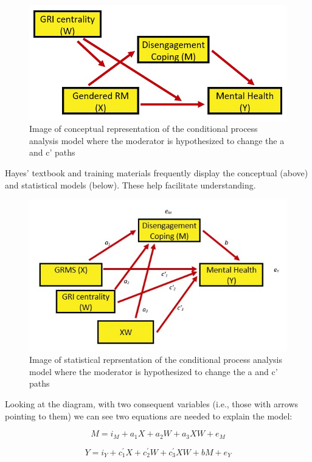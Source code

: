 \documentclass[
  english,
]{book}
\begin{document}
\begin{figure}
\centering
\includegraphics{images/ModMed/LewisModMed.jpg}
\caption{Image of conceptual representation of the conditional process analysis model where the moderator is hypothesized to change the a and c' paths}
\end{figure}

Hayes' \citeyearpar{hayes_introduction_2018} textbook and training materials frequently display the conceptual (above) and statistical models (below). These help facilitate understanding.

\begin{figure}
\centering
\includegraphics{images/ModMed/LewisStatistical.jpg}
\caption{Image of statistical reprsentation of the conditional process analysis model where the moderator is hypothesized to change the a and c' paths}
\end{figure}

Looking at the diagram, with two consequent variables (i.e., those with arrows pointing to them) we can see two equations are needed to explain the model:

\[M = i_{M}+a_{1}X + a_{2}W + a_{3}XW + e_{M}\]

\[Y = i_{Y}+c_{1}^{'}X+ c_{2}^{'}W+c_{3}^{'}XW+ bM+e_{Y}\]
\end{document}
